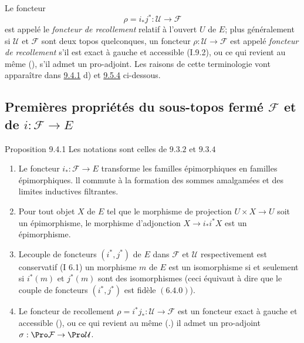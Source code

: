 Le foncteur
\begin{equation*}
\rho=i_{\ast}j^{\ast}:\mathcal{U}\longrightarrow
\mathcal{F}\tag{9.3.6.3}
\end{equation*}
est appelé le \emph{foncteur de recollement} relatif à l'ouvert $U$
de $E$; plus généralement si $\mathcal{U}$ et $\mathcal{F}$ sont
deux topos quelconques, un foncteur $\rho:\mathcal{U}\rightarrow
\mathcal{F}$ est appelé \emph{foncteur de recollement} s'il est
exact à gauche et accessible (I.9.2), ou ce qui revient au même
(), s'il admet un pro-adjoint. Les raisons de
cette terminologie vont apparaître dans \hyperref[IV.prop9.4.1]{9.4.1} d) et
\hyperref[IV.theo9.5.4]{9.5.4} ci-dessous.

\subsection{Premières propriétés du sous-topos fermé
$\mathcal{F}$ et de $i:\mathcal{F}\rightarrow
E$}

\begin{enonce*}{Proposition 9.4.1}
Les notations sont celles de $\hyperref[IV.subsubsec9.3.2]{9.3.2}$ et
$\hyperref[IV.prop9.3.4]{9.3.4}$
\begin{enumerate}
\renewcommand{\theenumi}{\alph{enumi}}
\renewcommand{\labelenumi}{\theenumi)}
\item Le foncteur $i_{\ast}:\mathcal{F}\rightarrow E$ transforme les
familles épimorphiques en familles épimorphiques. ll commute à la
formation des sommes amalgamées et des limites inductives
filtrantes.

\item Pour tout objet $X$ de $E$ tel que le morphisme de projection
$U\times X\rightarrow U$ soit un épimorphisme, le morphisme
d'adjonction $X\rightarrow i_{\ast} i^{\ast}X$ est un épimorphisme.

\item Le\pageoriginale couple de foncteurs $(i^{\ast}, j^{\ast})$ de
$E$ dans $\mathcal{F}$ et $\mathcal{U}$ respectivement est
conservatif {\rm (I 6.1)} \ie un morphisme $m$ de $E$ est un
isomorphisme si et seulement si $i^{\ast}(m)$ et $j^{\ast}(m)$ sont
des isomorphismes (ceci équivaut à dire que le couple de foncteurs
$(i^{\ast}, j^{\ast})$ est fidèle $(\hyperref[IV.subsubsec6.4.0]{6.4.0})$).

\item Le foncteur de recollement
$\rho=i^{\ast}j_{\ast}:\mathcal{U}\rightarrow \mathcal{F}$ est un
foncteur exact à gauche et accessible {\rm ()}, ou ce
qui revient au même {\rm(.)} il admet un pro-adjoint
$\sigma:\Pro\mathcal{F}\rightarrow \Pro \mathcal{U}$.
\end{enumerate}
\end{enonce*}

